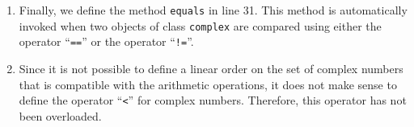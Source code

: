\begin{enumerate}
\item Finally, we define the method \texttt{equals} in line 31.  This method is automatically
      invoked when two objects of class \texttt{complex} are compared using either the
      operator ``\texttt{==}'' or the operator ``\texttt{!=}''.
\item Since it is not possible to define a linear order on the set of complex numbers that is
      compatible with the arithmetic operations, it does not make sense to define the operator
      ``\texttt{<}'' for complex numbers.  Therefore, this operator has not been overloaded.
\end{enumerate}


                
 
